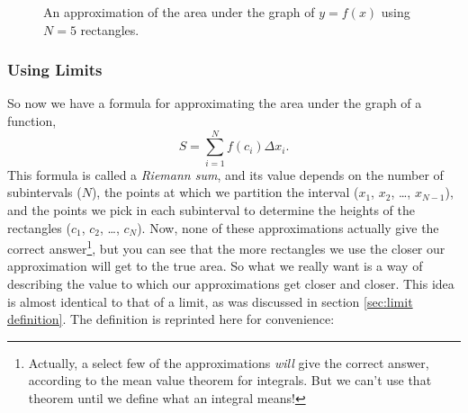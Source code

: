\documentclass{myarticle}
\theoremstyle{nospace}
\newtheorem{old series theorem}{Theorem}
\newenvironment{series theorem}{\begin{mdframed}\begin{old series theorem}}{\end{old series theorem}\end{mdframed}}
\begin{document}
\begin{figure}[htb!] \centering
{}
\caption{An approximation of the area under the graph of $y = f(x)$ using $N = 5$ rectangles.}
\label{fig:area n}
\end{figure}

\subsubsection{Using Limits} \label{sec:integral definition using limits}

So now we have a formula for approximating the area under the graph of a function, \[ S = \sum_{i=1}^N f(c_i)\Delta x_i. \] This formula is called a \emph{Riemann sum}, and its value depends on the number of subintervals ($N$), the points at which we partition the interval ($x_1$, $x_2$, \ldots, $x_{N-1}$), and the points we pick in each subinterval to determine the heights of the rectangles ($c_1$, $c_2$, \ldots, $c_N$). Now, none of these approximations actually give the correct answer\footnote{Actually, a select few of the approximations \emph{will} give the correct answer, according to the mean value theorem for integrals. But we can't use that theorem until we define what an integral means!}, but you can see that the more rectangles we use the closer our approximation will get to the true area. So what we really want is a way of describing the value to which our approximations get closer and closer. This idea is almost identical to that of a limit, as was discussed in section \ref{sec:limit definition}. The definition is reprinted here for convenience:
\end{document}
